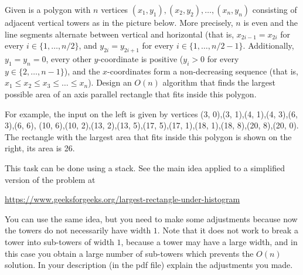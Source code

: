 \documentclass[11pt]{article}
\begin{document}
Given is a polygon with $n$ vertices  $(x_1, y_1),(x_2, y_2), \ldots,(x_n, y_n)$  consisting of adjacent vertical towers as in the picture below.
More precisely, $n$ is even and the line segments alternate between vertical and horizontal (that
is, $x_{2i - 1} = x_{2i}$
for every $i \in \{1, \ldots, n/2\}$, and $y_{2i} = y_{2i+1}$ for every $i \in \{1, \ldots, n/2 - 1\}$.
Additionally, $y_1 = y_n = 0$, every other $y$-coordinate is positive ($y_i > 0$ for every $y \in
\{2, \ldots, n - 1\}$), and the $x$-coordinates form a non-decreasing sequence (that is, $x_1 \leq x_2 \leq
x_3 \leq \ldots  \leq x_n$). Design an $O(n)$ algorithm that finds the largest possible area of an axis parallel
rectangle that fits inside this polygon.   

For example, the input on the left is given by vertices (3, 0),(3, 1),(4, 1),(4, 3),(6, 3),(6, 6),
(10, 6),(10, 2),(13, 2),(13, 5),(17, 5),(17, 1),(18, 1),(18, 8),(20, 8),(20, 0). The rectangle with
the largest area that fits inside this polygon is shown on the right, its area is 26.
\bigskip


\quad\quad
{}



This task can be done using a stack. See the main idea applied to a simplified version of the problem at

\url{https://www.geeksforgeeks.org/largest-rectangle-under-histogram}

You can use the same idea, but you need to make some adjustments because now the towers do not necessarily have width $1$. Note that it does not work to break a tower into sub-towers of width $1$, because a tower may have a large width, and in this case you obtain a large number of sub-towers which prevents the $O(n)$ solution. In your description (in the pdf file) explain the adjustments you made.
\end{document}

